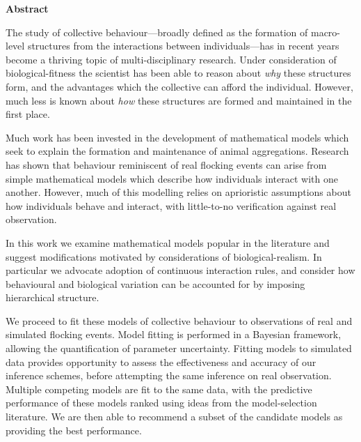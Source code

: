 \thispagestyle{empty}

\clearpage
\vspace*{\fill}

\begin{center}
  \textbf{Abstract}\\[0.75cm]

  \begin{minipage}{0.9\textwidth}
    \setlength{\parskip}{0.45em}

    The study of collective behaviour---broadly defined as the formation of
    macro-level structures from the interactions between individuals---has in
    recent years become a thriving topic of multi-disciplinary research. Under
    consideration of biological-fitness the scientist has been able to reason
    about \emph{why} these structures form, and the advantages which the
    collective can afford the individual. However, much less is known about
    \emph{how} these structures are formed and maintained in the first place.

    Much work has been invested in the development of mathematical models which
    seek to explain the formation and maintenance of animal aggregations.
    Research has shown that behaviour reminiscent of real flocking events can
    arise from simple mathematical models which describe how individuals
    interact with one another. However, much of this modelling relies on
    aprioristic assumptions about how individuals behave and interact, with
    little-to-no verification against real observation.

    In this work we examine mathematical models popular in the literature and
    suggest modifications motivated by considerations of biological-realism. In
    particular we advocate adoption of continuous interaction rules, and
    consider how behavioural and biological variation can be accounted for by
    imposing hierarchical structure.

    We proceed to fit these models of collective behaviour to observations of
    real and simulated flocking events. Model fitting is performed in a
    Bayesian framework, allowing the quantification of parameter uncertainty.
    Fitting models to simulated data provides opportunity to assess the
    effectiveness and accuracy of our inference schemes, before attempting the
    same inference on real observation. Multiple competing models are fit to
    the same data, with the predictive performance of these models ranked using
    ideas from the model-selection literature. We are then able to recommend a
    subset of the candidate models as providing the best performance.


\end{minipage}
\end{center}
